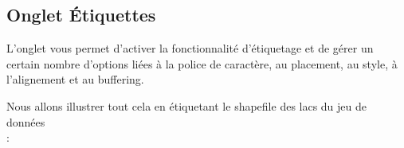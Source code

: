 \subsection{Onglet Étiquettes}

L'onglet  vous permet d'activer la fonctionnalité d'étiquetage et de gérer un certain nombre d'options liées à la police de caractère, au placement, au style, à l'alignement et au buffering.

Nous allons illustrer tout cela en étiquetant le shapefile des lacs du jeu de données\\  :

